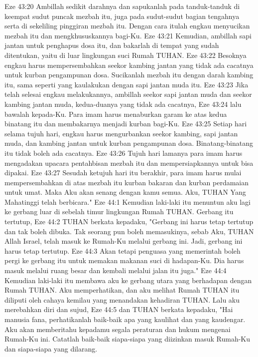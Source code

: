 Eze 43:20  Ambillah sedikit darahnya dan sapukanlah pada tanduk-tanduk di keempat sudut puncak mezbah itu, juga pada sudut-sudut bagian tengahnya serta di sekeliling pinggiran mezbah itu. Dengan cara itulah engkau menyucikan mezbah itu dan mengkhususkannya bagi-Ku.
Eze 43:21  Kemudian, ambillah sapi jantan untuk penghapus dosa itu, dan bakarlah di tempat yang sudah ditentukan, yaitu di luar lingkungan suci Rumah TUHAN.
Eze 43:22  Besoknya engkau harus mempersembahkan seekor kambing jantan yang tidak ada cacatnya untuk kurban pengampunan dosa. Sucikanlah mezbah itu dengan darah kambing itu, sama seperti yang kaulakukan dengan sapi jantan muda itu.
Eze 43:23  Jika telah selesai engkau melakukannya, ambillah seekor sapi jantan muda dan seekor kambing jantan muda, kedua-duanya yang tidak ada cacatnya,
Eze 43:24  lalu bawalah kepada-Ku. Para imam harus menaburkan garam ke atas kedua binatang itu dan membakarnya menjadi kurban bagi-Ku.
Eze 43:25  Setiap hari selama tujuh hari, engkau harus mengurbankan seekor kambing, sapi jantan muda, dan kambing jantan untuk kurban pengampunan dosa. Binatang-binatang itu tidak boleh ada cacatnya.
Eze 43:26  Tujuh hari lamanya para imam harus mengadakan upacara pentahbisan mezbah itu dan mempersiapkannya untuk bisa dipakai.
Eze 43:27  Sesudah ketujuh hari itu berakhir, para imam harus mulai mempersembahkan di atas mezbah itu kurban bakaran dan kurban perdamaian untuk umat. Maka Aku akan senang dengan kamu semua. Aku, TUHAN Yang Mahatinggi telah berbicara."
Eze 44:1  Kemudian laki-laki itu menuntun aku lagi ke gerbang luar di sebelah timur lingkungan Rumah TUHAN. Gerbang itu tertutup,
Eze 44:2  TUHAN berkata kepadaku, "Gerbang ini harus tetap tertutup dan tak boleh dibuka. Tak seorang pun boleh memasukinya, sebab Aku, TUHAN Allah Israel, telah masuk ke Rumah-Ku melalui gerbang ini. Jadi, gerbang ini harus tetap tertutup.
Eze 44:3  Akan tetapi penguasa yang memerintah boleh pergi ke gerbang itu untuk memakan makanan suci di hadapan-Ku. Dia harus masuk melalui ruang besar dan kembali melalui jalan itu juga."
Eze 44:4  Kemudian laki-laki itu membawa aku ke gerbang utara yang berhadapan dengan Rumah TUHAN. Aku memperhatikan, dan aku melihat Rumah TUHAN itu diliputi oleh cahaya kemilau yang menandakan kehadiran TUHAN. Lalu aku merebahkan diri dan sujud,
Eze 44:5  dan TUHAN berkata kepadaku, "Hai manusia fana, perhatikanlah baik-baik apa yang kaulihat dan yang kaudengar. Aku akan memberitahu kepadamu segala peraturan dan hukum mengenai Rumah-Ku ini. Catatlah baik-baik siapa-siapa yang diizinkan masuk Rumah-Ku dan siapa-siapa yang dilarang.
